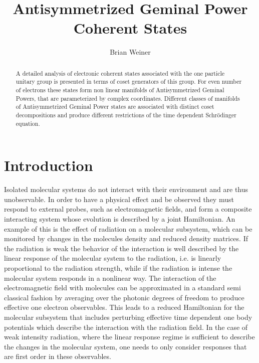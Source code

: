 \documentclass[12pt,aps,amsfonts,amssymb,tightenlines]{revtex4}%
\begin{document}
\title{Antisymmetrized Geminal Power Coherent States}
\author{Brian Weiner}
\keywords{}

\begin{abstract}
A detailed analysis of electronic coherent states associated with the one
particle unitary group is presented in terms of coset generators of this
group. For even number of electrons these states form non linear manifolds of
Antisymmetrized Geminal Powers, that are parameterized by complex coordinates.
Different classes of manifolds of Antisymmetrized Geminal Power states are
associated with distinct coset decompositions and produce different
restrictions of the time dependent Schr\"{o}dinger equation.

\end{abstract}
\maketitle
\tableofcontents


\newpage

\section{Introduction\label{intro}}

Isolated molecular systems do not interact with their environment and are thus
unobservable. In order to have a physical effect and be observed they must
respond to external probes, such as electromagnetic fields, and form a
composite interacting system whose evolution is described by a joint
Hamiltonian. An example of this is the effect of radiation on a molecular
subsystem, which can be monitored by changes in the molecules density and
reduced density matrices. If the radiation is weak the behavior of the
interaction is well described by the linear response of the molecular system
to the radiation, i.e. is linearly proportional to the radiation strength,
while if the radiation is intense the molecular system responds in a nonlinear
way. The interaction of the electromagnetic field with molecules can be
approximated in a standard semi classical fashion by averaging over the
photonic degrees of freedom to produce effective one electron observables.
This leads to a reduced Hamiltonian for the molecular subsystem that includes
perturbing effective time dependent one body potentials which describe the
interaction with the radiation field. In the case of weak intensity radiation,
where the linear response regime is sufficient to describe the changes in the
molecular system, one needs to only consider responses that are first order in
these observables.
\end{document}
